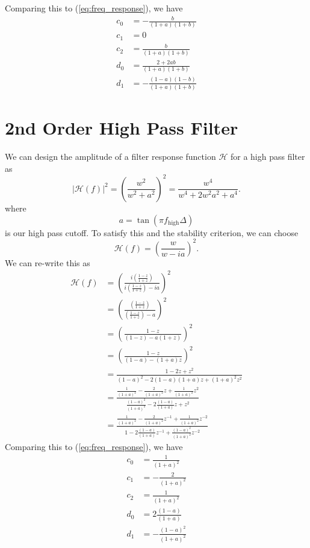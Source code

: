 \documentclass[a4paper]{article}
\begin{document}
Comparing this to (\ref{eq:freq_response}), we have
\begin{align}
c_0 &= -\frac{b}{(1 + a)(1 + b)} \label{eq:c0}\\
c_1 &= 0 \\
c_2 &= \frac{b}{(1 + a)(1 + b)} \\
d_0 &= \frac{2 +2ab}{(1 + a)(1 + b)} \\
d_1 &= -\frac{(1-a)(1-b)}{(1 + a)(1 + b)} \label{eq:d1}
\end{align}

\section{2nd Order High Pass Filter}
We can design the amplitude of a filter response function $\mathcal{H}$ for a high pass filter as
\begin{equation}
|\mathcal{H}(f)|^2 = \left(\frac{w^2}{w^2 + a^2}\right)^2 = \frac{w^4}{w^4 + 2 w^2a^2 + a^4}.
\end{equation}
where
\begin{equation}
a = \tan(\pi f_\textrm{high} \Delta)
\end{equation}
is our high pass cutoff.  To satisfy this and the stability criterion, we can choose
\begin{equation}
\mathcal{H}(f) = \left(\frac{w}{w - ia}\right)^2.
\end{equation}
We can re-write this as
\begin{align}
\mathcal{H}(f) & = \left(\frac{i \left(\frac{1-z}{1+z}\right)}{i \left(\frac{1-z}{1+z}\right) - ia}\right)^2 \\
 & = \left(\frac{ \left(\frac{1-z}{1+z}\right)}{ \left(\frac{1-z}{1+z}\right) - a}\right)^2 \\
 & = \left(\frac{1-z}{ (1-z) - a(1+z)}\right)^2 \\
 & = \left(\frac{1-z}{ (1-a) - (1+a)z}\right)^2 \\
 & = \frac{1-2 z + z^2}{ (1-a)^2 - 2 (1-a)(1+a)z + (1+a)^2 z^2 } \\
 & = \frac{\frac{1}{(1+a)^2}-\frac{2}{(1+a)^2} z + \frac{1}{(1+a)^2} z^2}{ \frac{(1-a)^2}{(1+a)^2} - 2 \frac{(1-a)}{(1+a)}z + z^2 } \\
& = \frac{\frac{1}{(1+a)^2} -\frac{2}{(1+a)^2} z^{-1} + \frac{1}{(1+a)^2} z^{-2}}{ 1 - 2 \frac{(1-a)}{(1+a)}z^{-1} + \frac{(1-a)^2}{(1+a)^2} z^{-2} }
\end{align}
Comparing this to (\ref{eq:freq_response}), we have
\begin{align}
c_0 &= \frac{1}{(1+a)^2} \\
c_1 &= -\frac{2}{(1+a)^2} \\
c_2 &= \frac{1}{(1+a)^2} \\
d_0 &= 2 \frac{(1-a)}{(1+a)} \\
d_1 &= -\frac{(1-a)^2}{(1+a)^2}
\end{align}
\end{document}
